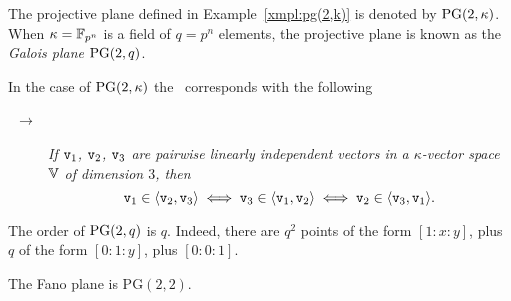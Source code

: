 \begin{ntn}
    The projective plane defined in\/ {\upshape Example~\ref{xmpl:pg(2,k)}} is denoted by\/ $\operatorname{PG}(2,\kappa)$. When\/ $\kappa=\mathbb{F}_{p^{n}}$ is a field of\/ $q=p^n$ elements, the projective plane is known as the \textsl{Galois plane}\/ $\operatorname{PG}(2,q)$.
\end{ntn}

\begin{rem}
    In the case of $\operatorname{PG}(2,\kappa)$ the \rr\ corresponds with the following
    \begin{description}
        \item[\ $\to$] 
        \textit{If\/ $\mathtt v_1$, $\mathtt v_2$, $\mathtt v_3$ are pairwise linearly independent vectors in a\/ $\kappa$-vector space\/ $\mathbb V$ of dimension\/ $3$, then}
        \[
            \mathtt v_1\in\langle\mathtt v_2,\mathtt v_3\rangle
            \iff \mathtt v_3\in\langle\mathtt v_1,\mathtt v_2\rangle
            \iff \mathtt v_2\in\langle\mathtt v_3,\mathtt v_1\rangle.
        \]
    \end{description}
\end{rem}

\begin{rem}\label{rem:order-of-galois-plane}
    The order of $\operatorname{PG}(2,q)$ is $q$. Indeed, there are $q^2$ points of the form $[1:x:y]$, plus $q$ of the form $[0:1:y]$, plus $[0:0:1]$.
\end{rem}

\begin{prop}\label{prop:Fano=PG(2,2)}
    The Fano plane is $\mathrm{PG}(2,2)$.
\end{prop}


